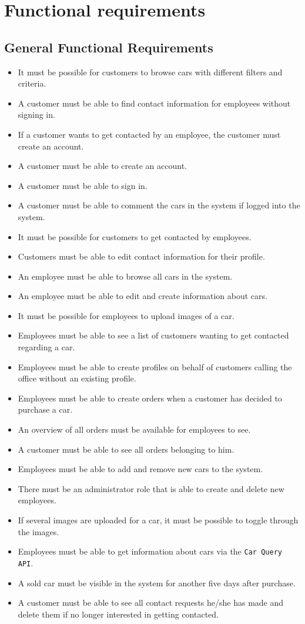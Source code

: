 \section{Functional requirements}

\subsection{General Functional Requirements}
\begin{itemize}
    \item It must be possible for customers to browse cars with different filters and criteria.
    \item A customer must be able to find contact information for employees without signing in.
    \item If a customer wants to get contacted by an employee, the customer must create an account.
    \item A customer must be able to create an account.
    \item A customer must be able to sign in.
    \item A customer must be able to comment the cars in the system if logged into the system.
    \item It must be possible for customers to get contacted by employees.
    \item Customers must be able to edit contact information for their profile.
    \item An employee must be able to browse all cars in the system.
    \item An employee must be able to edit and create information about cars.
    \item It must be possible for employees to upload images of a car.
    \item Employees must be able to see a list of customers wanting to get contacted regarding a car.
    \item Employees must be able to create profiles on behalf of customers calling the office without an existing profile.
    \item Employees must be able to create orders when a customer has decided to purchase a car.
    \item An overview of all orders must be available for employees to see.
    \item A customer must be able to see all orders belonging to him.
    \item Employees must be able to add and remove new cars to the system.
    \item There must be an administrator role that is able to create and delete new employees.
    \item If several images are uploaded for a car, it must be possible to toggle through the images.
    \item Employees must be able to get information about cars via the \texttt{Car Query API}.
    \item A sold car must be visible in the system for another five days after purchase.
    \item A customer must be able to see all contact requests he/she has made and delete them if no longer interested in getting contacted.
\end{itemize}

